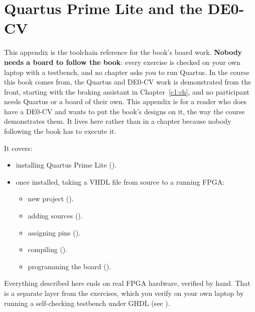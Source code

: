 
\chapter{Quartus Prime Lite and the DE0-CV}
\label{app:quartus}

This appendix is the toolchain reference for the book's board work. \textbf{Nobody needs a board to
follow the book}: every exercise is checked on your own laptop with a testbench, and no chapter asks
you to run Quartus. In the course this book comes from, the Quartus and DE0-CV work is demonstrated
from the front, starting with the braking assistant in Chapter~\ref{c1:ch}, and no participant
needs Quartus or a board of their own. This appendix is for a reader who does have a DE0-CV and
wants to put the book's designs on it, the way the course demonstrates them. It lives here rather
than in a chapter because nobody following the book has to execute it.

It covers:
\begin{itemize}
  \item installing Quartus Prime Lite ().
  \item once installed, taking a VHDL file from source to a running FPGA:
  \begin{itemize}
    \item new project ().
    \item adding sources ().
    \item assigning pins ().
    \item compiling ().
    \item programming the board ().
  \end{itemize}
\end{itemize}

Everything described here ends on real FPGA hardware, verified by hand. That is a separate layer
from the exercises, which you verify on your own laptop by running a self-checking testbench under
GHDL (see ).

